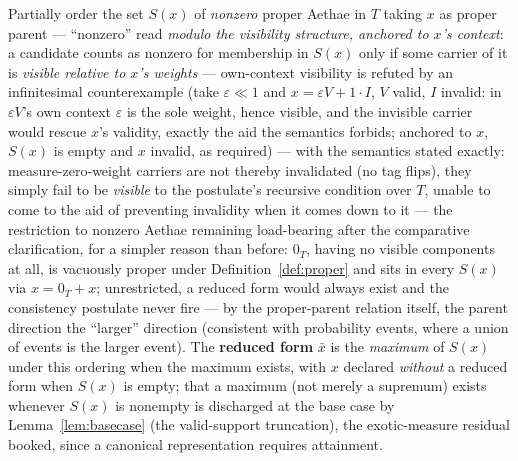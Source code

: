 \begin{defin}\label{def:reduced}
Partially order the set $S(x)$ of \emph{nonzero} proper Aethae in $T$ taking $x$ as proper parent --- ``nonzero'' read \emph{modulo the visibility structure, anchored to $x$'s context}: a candidate counts as nonzero for membership in $S(x)$ only if some carrier of it is \emph{visible relative to $x$'s weights} --- own-context visibility is refuted by an infinitesimal counterexample (take $\varepsilon \ll 1$ and $x = \varepsilon V + 1 \cdot I$, $V$ valid, $I$ invalid: in $\varepsilon V$'s own context $\varepsilon$ is the sole weight, hence visible, and the invisible carrier would rescue $x$'s validity, exactly the aid the semantics forbids; anchored to $x$, $S(x)$ is empty and $x$ invalid, as required) --- with the semantics stated exactly: measure-zero-weight carriers are not thereby invalidated (no tag flips), they simply fail to be \emph{visible} to the postulate's recursive condition over $T$, unable to come to the aid of preventing invalidity when it comes down to it --- the restriction to nonzero Aethae remaining load-bearing after the comparative clarification, for a simpler reason than before: $0_T$, having no visible components at all, is vacuously proper under Definition~\ref{def:proper} and sits in every $S(x)$ via $x = 0_T + x$; unrestricted, a reduced form would always exist and the consistency postulate never fire --- by the proper-parent relation itself, the parent direction the ``larger'' direction (consistent with probability events, where a union of events is the larger event). The \textbf{reduced form} $\bar{x}$ is the \emph{maximum} of $S(x)$ under this ordering when the maximum exists, with $x$ declared \emph{without} a reduced form when $S(x)$ is empty; that a maximum (not merely a supremum) exists whenever $S(x)$ is nonempty is discharged at the base case by Lemma~\ref{lem:basecase} (the valid-support truncation), the exotic-measure residual booked, since a canonical representation requires attainment.

\end{defin}
